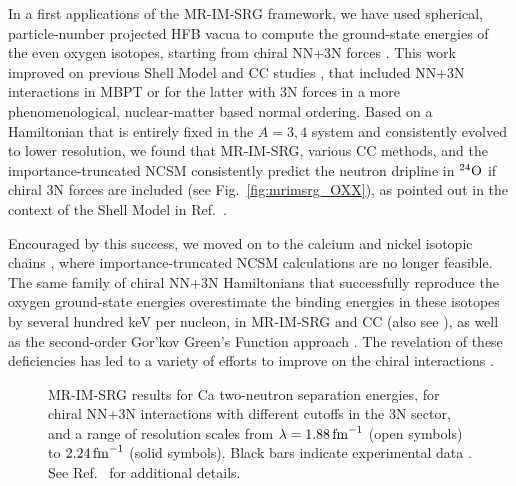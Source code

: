 In a first applications of the MR-IM-SRG framework, we have used
spherical, particle-number projected HFB vacua to compute the
ground-state energies of the even oxygen isotopes, starting from
chiral NN+3N forces \cite{Hergert:2013ij}. This work improved on
previous Shell Model \cite{Otsuka:2010cr,Holt:2013fk} and CC studies
\cite{Hagen:2012oq}, that included NN+3N interactions in MBPT or for
the latter with 3N forces in a more phenomenological, nuclear-matter
based normal ordering.  Based on a Hamiltonian that is entirely fixed
in the $A=3,4$ system and consistently evolved to lower resolution, we
found that MR-IM-SRG, various CC methods, and the importance-truncated
NCSM consistently predict the neutron dripline in $\nuc{O}{24}$ if
chiral 3N forces are included (see Fig.~\ref{fig:mrimsrg_OXX}), as
pointed out in the context of the Shell Model in
Ref.~\cite{Otsuka:2010cr}.

Encouraged by this success, we moved on to the calcium and nickel
isotopic chains \cite{Hergert:2014vn}, where importance-truncated NCSM
calculations are no longer feasible. The same family of chiral NN+3N
Hamiltonians that successfully reproduce the oxygen ground-state
energies overestimate the binding energies in these isotopes by
several hundred keV per nucleon, in MR-IM-SRG and CC (also see
\cite{Roth:2012qf,Binder:2013zr,Binder:2014fk}), as well as the
second-order Gor'kov Green's Function approach \cite{Soma:2014eu}.
The revelation of these deficiencies has led to a variety of efforts
to improve on the chiral interactions
\cite{Ekstrom:2015fk,Hagen:2015ve,Epelbaum:2015fb,Epelbaum:2015gf,Entem:2015hl,Entem:2015qf,Carlsson:2015fk,Gezerlis:2014zr,Piarulli:2015rm,Lynn:2015eu}.

\begin{figure}[t]
  \setlength{\unitlength}{0.72\textwidth}
  \begin{center}
  \end{center}
  \vspace{-30pt}
  \caption{\label{fig:mrimsrg_CaXX} 
    MR-IM-SRG results for Ca two-neutron separation energies, 
    for chiral NN+3N interactions 
    with different cutoffs in the 3N sector, and a range of resolution scales 
    from $\lambda=1.88\fmi$ (open symbols) to $2.24\fmi$ (solid symbols).
    Black bars indicate experimental data \cite{Wang:2012uq,Wienholtz:2013bh}.
    See Ref.~\cite{Hergert:2014vn} for additional details. 
    }
\end{figure}

